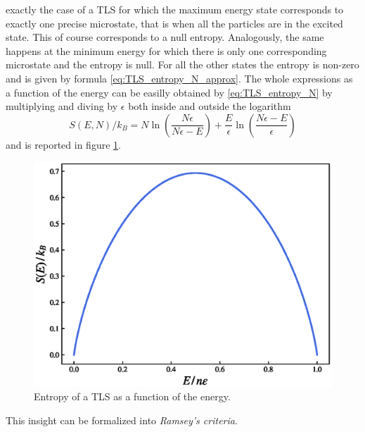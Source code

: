 exactly the case of a TLS for which the maximum energy state corresponds to exactly one precise microstate, that is when all the particles are in the excited state. This of course corresponds to a null entropy. Analogously, the same happens at the minimum energy for which there is only 
one corresponding microstate and the entropy is null. For all the other states the entropy is non-zero and is given by formula \ref{eq:TLS_entropy_N_approx}. The whole expressions as a function of the energy can be easilly obtained by \ref{eq:TLS_entropy_N} by multiplying and diving by $\epsilon$ both inside and outside the logarithm
\begin{equation}
    S(E, N) / k_B = N \ln\left(\frac{N\epsilon}{N\epsilon - E}\right) + \frac{E}{\epsilon} \ln\left(\frac{N\epsilon - E}{\epsilon}\right)
    \label{eq:entropy_E_TLS}
\end{equation}
and is reported in figure \ref{fig:TLS_entropy_E}. \\
\begin{figure}[h]
    \centering 
    \includegraphics[scale=0.65]{images/entropy_TLS.eps}
    \caption{Entropy of a TLS as a function of the energy.}
    \label{fig:TLS_entropy_E}
\end{figure}
This insight can be formalized into \emph{Ramsey's criteria}.
\newpage
